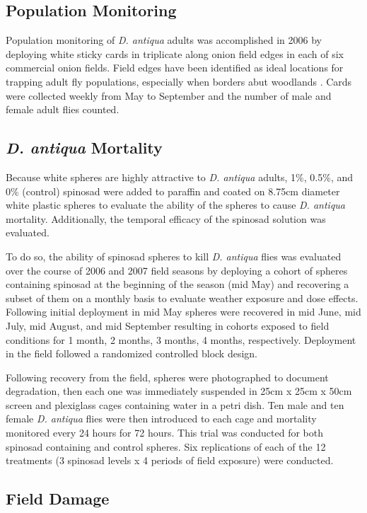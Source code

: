 \documentclass[alpha-refs]{wiley-article}
\begin{document}
\subsection{Population Monitoring}

Population monitoring of \textit{D. antiqua} adults was accomplished in 2006 by deploying white sticky cards in triplicate along onion field edges in each of six commercial onion fields.  Field edges have been identified as ideal locations for trapping adult fly populations, especially when borders abut woodlands \citep{werling2006spatial}.  Cards were collected weekly from May to September and the number of male and female adult flies counted.

\subsection{\textit{D. antiqua} Mortality}

Because white spheres are highly attractive to \textit{D. antiqua} adults, 1\%, 0.5\%, and 0\% (control) spinosad were added to paraffin and coated on 8.75cm diameter white plastic spheres to evaluate the ability of the spheres to cause \textit{D. antiqua} mortality. Additionally, the temporal efficacy of the spinosad solution was evaluated.

To do so, the ability of spinosad spheres to kill \textit{D. antiqua} flies was evaluated over the course of 2006 and 2007 field seasons by deploying a cohort of spheres containing spinosad at the beginning of the season (mid May) and recovering a subset of them on a monthly basis to evaluate weather exposure and dose effects.  Following initial deployment in mid May spheres were recovered in mid June, mid July, mid August, and mid September resulting in cohorts exposed to field conditions for 1 month, 2 months, 3 months, 4 months, respectively. Deployment in the field followed a randomized controlled block design.

Following recovery from the field, spheres were photographed to document degradation, then each one was immediately suspended in 25cm x 25cm x 50cm screen and plexiglass cages containing water in a petri dish. Ten male and ten female \textit{D. antiqua} flies were then introduced to each cage and mortality monitored every 24 hours for 72 hours. This trial was conducted for both spinosad containing and control spheres. Six replications of each of the 12 treatments (3 spinosad levels x 4 periods of field exposure) were conducted.
 

\subsection{Field Damage}
\end{document}
